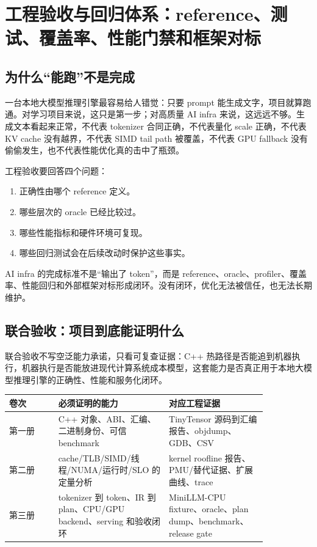 \section{工程验收与回归体系：reference、测试、覆盖率、性能门禁和框架对标}

\subsection{为什么“能跑”不是完成}

一台本地大模型推理引擎最容易给人错觉：只要 prompt 能生成文字，项目就算跑通。对学习项目来说，这只是第一步；对高质量 AI infra 来说，这远远不够。生成文本看起来正常，不代表 tokenizer 合同正确，不代表量化 scale 正确，不代表 KV cache 没有越界，不代表 SIMD tail path 被覆盖，不代表 GPU fallback 没有偷偷发生，也不代表性能优化真的击中了瓶颈。

工程验收要回答四个问题：

\begin{enumerate}
  \item 正确性由哪个 reference 定义。
  \item 哪些层次的 oracle 已经比较过。
  \item 哪些性能指标和硬件环境可复现。
  \item 哪些回归测试会在后续改动时保护这些事实。
\end{enumerate}

\begin{keyidea}
AI infra 的完成标准不是“输出了 token”，而是 reference、oracle、profiler、覆盖率、性能回归和外部框架对标形成闭环。没有闭环，优化无法被信任，也无法长期维护。
\end{keyidea}

\subsection{联合验收：项目到底能证明什么}

联合验收不写空泛能力承诺，只看可复查证据：C++ 热路径是否能追到机器执行，机器执行是否能放进现代计算系统成本模型，这套能力是否真正用于本地大模型推理引擎的正确性、性能和服务化闭环。

\begin{center}
\begin{tabular}{p{0.16\linewidth}p{0.36\linewidth}p{0.32\linewidth}}
\toprule
卷次 & 必须证明的能力 & 对应工程证据 \\
\midrule
第一册 & C++ 对象、ABI、汇编、二进制身份、可信 benchmark & TinyTensor 源码到汇编报告、objdump、GDB、CSV \\
第二册 & cache/TLB/SIMD/线程/NUMA/运行时/SLO 的定量分析 & kernel roofline 报告、PMU/替代证据、扩展曲线、trace \\
第三册 & tokenizer 到 token、IR 到 plan、CPU/GPU backend、serving 和验收闭环 & MiniLLM-CPU fixture、oracle、plan dump、benchmark、release gate \\
\bottomrule
\end{tabular}
\end{center}

